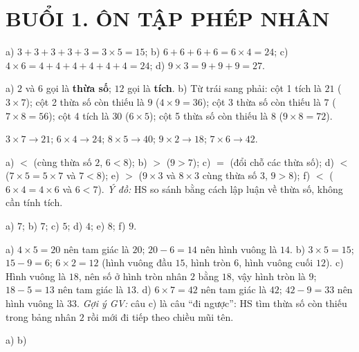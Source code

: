 \documentclass[../main.tex]{subfiles}
\begin{document}
\section*{BUỔI 1. ÔN TẬP PHÉP NHÂN}
 a) $3+3+3+3+3=3\times5=15$; b) $6+6+6+6=6\times4=24$; c) $4\times6=4+4+4+4+4+4=24$; d) $9\times3=9+9+9=27$.

 a) $2$ và $6$ gọi là \textbf{thừa số}; $12$ gọi là \textbf{tích}. b) Từ trái sang phải: cột 1 tích là $21$ ($3\times7$); cột 2 thừa số còn thiếu là $9$ ($4\times9=36$); cột 3 thừa số còn thiếu là $7$ ($7\times8=56$); cột 4 tích là $30$ ($6\times5$); cột 5 thừa số còn thiếu là $8$ ($9\times8=72$).

 $3\times7\to21$; $6\times4\to24$; $8\times5\to40$; $9\times2\to18$; $7\times6\to42$.

 a) $<$ (cùng thừa số $2$, $6<8$); b) $>$ ($9>7$); c) $=$ (đổi chỗ các thừa số); d) $<$ ($7\times5=5\times7$ và $7<8$); e) $>$ ($9\times3$ và $8\times3$ cùng thừa số $3$, $9>8$); f) $<$ ($6\times4=4\times6$ và $6<7$). \textit{Ý đồ:} HS so sánh bằng cách lập luận về thừa số, không cần tính tích.

 a) $7$; b) $7$; c) $5$; d) $4$; e) $8$; f) $9$.

 a) $4\times5=20$ nên tam giác là $20$; $20-6=14$ nên hình vuông là $14$. b) $3\times5=15$; $15-9=6$; $6\times2=12$ (hình vuông đầu $15$, hình tròn $6$, hình vuông cuối $12$). c) Hình vuông là $18$, nên số ở hình tròn nhân $2$ bằng $18$, vậy hình tròn là $9$; $18-5=13$ nên tam giác là $13$. d) $6\times7=42$ nên tam giác là $42$; $42-9=33$ nên hình vuông là $33$. \textit{Gợi ý GV:} câu c) là câu ``đi ngược'': HS tìm thừa số còn thiếu trong bảng nhân $2$ rồi mới đi tiếp theo chiều mũi tên.

 a) 
b) 

 

 
\end{document}
